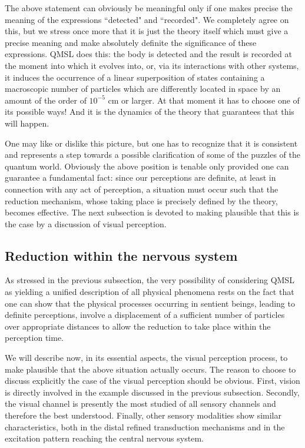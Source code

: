 \documentclass[12pt]{article}
\begin{document}
The above statement can obviously be meaningful only if one makes
precise the meaning of the expressions ``detected" and
``recorded". We completely agree on this, but we stress once more
that it is just the theory itself which must give a precise
meaning and make absolutely definite the significance of these
expressions. QMSL does this: the body is detected and the result
is recorded at the moment into which it evolves into, or, via its
interactions with other systems, it induces the occurrence of a
linear superposition of states containing a macroscopic number of
particles which are differently located in space by an amount of
the order of $10^{-5}$ cm or larger. At that moment it has to
choose one of its possible ways! And it is the dynamics of the
theory that guarantees that this will happen.

One may like or dislike this picture, but one has to recognize
that it is consistent and represents a step towards a possible
clarification of some of the puzzles of the quantum world.
Obviously the above position is tenable only provided one can
guarantee a fundamental fact: since our perceptions are definite,
at least in connection with any act of perception, a situation
must occur such that the reduction mechanism, whose taking place
is precisely defined by the theory, becomes effective. The next
subsection is devoted to making plausible that this is the case by
a discussion of visual perception.


\subsection{Reduction within the nervous system} \label{sec143}

As stressed in the previous subsection, the very possibility of
considering QMSL as yielding a unified description of all physical
phenomena rests on the fact that one can show that the physical
processes occurring in sentient beings, leading to definite
perceptions, involve a displacement of a sufficient number of
particles over appropriate distances to allow the reduction to
take place within the perception time.

We will describe now, in its essential aspects, the visual
perception process, to make plausible that the above situation
actually occurs. The reason to choose to discuss explicitly the
case of the visual perception should be obvious. First, vision is
directly involved in the example discussed in the previous
subsection. Secondly, the visual channel is presently the most
studied of all sensory channels and therefore the best understood.
Finally, other sensory modalities show similar characteristics,
both in the distal refined transduction mechanisms and in the
excitation pattern reaching the central nervous system.
\end{document}
